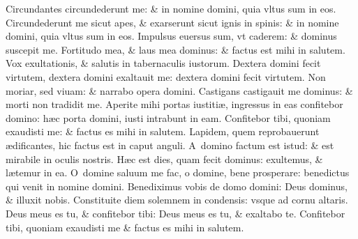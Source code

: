 \documentclass[a5paper,10pt]{book}
\def\ae{æ}
\begin{document}
\begin{multicols*}{2}
\newline \color{red} C\color{black}ircundantes circundederunt me: \& in nomine domini, quia vltus sum in eos.
\newline \color{red} C\color{black}ircundederunt me sicut apes, \& exarserunt sicut ignis in spinis: \& in nomine domini, quia vltus sum in eos.
\newline \color{red} I\color{black}mpulsus euersus sum, vt caderem: \& dominus suscepit me.
\newline \color{red} F\color{black}ortitudo mea, \& laus mea dominus: \& factus est mihi in salutem.
\newline \color{red} V\color{black}ox exultationis, \& salutis in tabernaculis iustorum.
\newline \color{red} D\color{black}extera domini fecit virtutem, dextera domini exaltauit me: dextera domini fecit virtutem.
\newline \color{red} N\color{black}on moriar, sed viuam: \& narrabo opera domini.
\newline \color{red} C\color{black}astigans castigauit me dominus: \& morti non tradidit me.
\newline \color{red} A\color{black}perite mihi portas iustiti\ae , ingressus in eas confitebor domino: h\ae c porta domini, iusti intrabunt in eam.
\newline \color{red} C\color{black}onfitebor tibi, quoniam exaudisti me: \& factus es mihi in salutem.
\newline \color{red} L\color{black}apidem, quem reprobauerunt \ae dificantes, hic factus est in caput anguli.
\newline \color{red} A\color{black}\ domino factum est istud: \& est mirabile in oculis nostris.
\newline \color{red} H\color{black}\ae c est dies, quam fecit dominus: exultemus, \& l\ae temur in ea.
\newline \color{red} O\color{black}\ domine saluum me fac, o domine, bene prosperare: benedictus qui venit in nomine domini.
\newline \color{red} B\color{black}enediximus vobis de domo domini: Deus dominus, \& illuxit nobis.
\newline \color{red} C\color{black}onstituite diem solemnem in condensis: vsque ad cornu altaris.
\newline \color{red} D\color{black}eus meus es tu, \& confitebor tibi: Deus meus es tu, \& exaltabo te.
\newline \color{red} C\color{black}onfitebor tibi, quoniam exaudisti me \& factus es mihi in salutem.

\end{multicols*}
\end{document}
